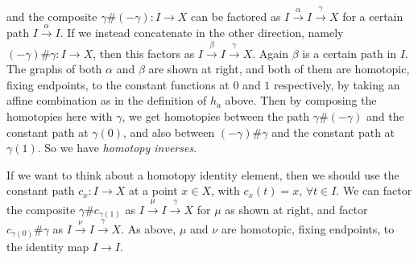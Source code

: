 \documentclass{tufte-handout}
\theoremstyle{definition}
\begin{document}
{\medskip

\noindent
{}
\qquad
{}}
%
and the composite $\gamma \# (-\gamma)\colon I \to X$ can be factored as 
$I\xrightarrow{\alpha} I \xrightarrow{\gamma} X$ for a certain path $I\xrightarrow{\alpha} 
I$. If we instead concatenate in the other direction, namely $(-\gamma)\# \gamma\colon 
I\to X$, then this factors as $I\xrightarrow{\beta} I\xrightarrow{\gamma}X$. Again 
$\beta$ is a certain path in $I$. The graphs of both $\alpha$ and $\beta$ are shown at 
right, and both of them are homotopic, fixing endpoints, to the constant functions at 
$0$ and $1$ respectively, by taking an affine combination as in the definition of $h_a$ 
above. Then by composing the homotopies here with $\gamma$, we get homotopies between 
the path $\gamma\#(-\gamma)$ and the constant path at $\gamma(0)$, and also between 
$(-\gamma)\#\gamma$ and the constant path at $\gamma(1)$. So we have \emph{homotopy 
inverses}.

If we want to think about a homotopy identity element, then we should use the constant 
path $c_x\colon I\to X$ at a point $x\in X$, with $c_x(t)= x$, $\forall t\in I$. We can 
factor the composite $\gamma\# c_{\gamma(1)}$ as $I\xrightarrow{\mu} I 
\xrightarrow{\gamma} X$ for $\mu$ as shown at right, and factor $c_{\gamma(0)}\#\gamma$ 
as $I\xrightarrow{\nu} I \xrightarrow{\gamma} X$. As above, $\mu$ and $\nu$ are 
homotopic, fixing endpoints, to the identity map $I\to I$.
\end{document}
